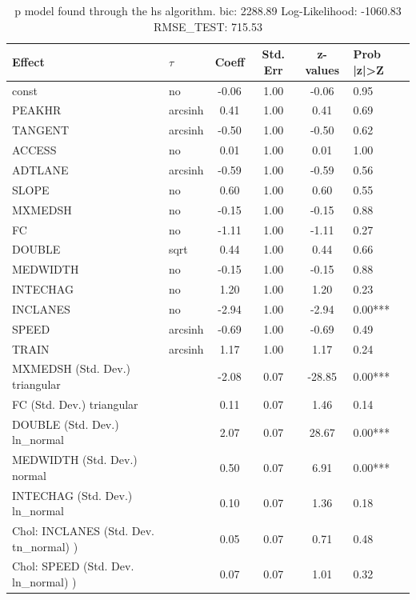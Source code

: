 \begin{table}
	\caption{p model found through the hs algorithm. bic: 2288.89 Log-Likelihood: -1060.83 RMSE_TEST: 715.53}
	\begin{center}
		\begin{tabular}{|l|l|c|c|c|l|}
			\hline
			Effect & $\tau$ & Coeff & Std. Err & z-values & Prob |z|>Z \\
			\hline
			const & no & -0.06 & 1.00 & -0.06 & 0.95 \\
			\hline
			PEAKHR & arcsinh & 0.41 & 1.00 & 0.41 & 0.69 \\
			\hline
			TANGENT & arcsinh & -0.50 & 1.00 & -0.50 & 0.62 \\
			\hline
			ACCESS & no & 0.01 & 1.00 & 0.01 & 1.00 \\
			\hline
			ADTLANE & arcsinh & -0.59 & 1.00 & -0.59 & 0.56 \\
			\hline
			SLOPE & no & 0.60 & 1.00 & 0.60 & 0.55 \\
			\hline
			MXMEDSH & no & -0.15 & 1.00 & -0.15 & 0.88 \\
			\hline
			FC & no & -1.11 & 1.00 & -1.11 & 0.27 \\
			\hline
			DOUBLE & sqrt & 0.44 & 1.00 & 0.44 & 0.66 \\
			\hline
			MEDWIDTH & no & -0.15 & 1.00 & -0.15 & 0.88 \\
			\hline
			INTECHAG & no & 1.20 & 1.00 & 1.20 & 0.23 \\
			\hline
			INCLANES & no & -2.94 & 1.00 & -2.94 & 0.00*** \\
			\hline
			SPEED & arcsinh & -0.69 & 1.00 & -0.69 & 0.49 \\
			\hline
			TRAIN & arcsinh & 1.17 & 1.00 & 1.17 & 0.24 \\
			\hline
			MXMEDSH (Std. Dev.) triangular &  & -2.08 & 0.07 & -28.85 & 0.00*** \\
			\hline
			FC (Std. Dev.) triangular &  & 0.11 & 0.07 & 1.46 & 0.14 \\
			\hline
			DOUBLE (Std. Dev.) ln_normal &  & 2.07 & 0.07 & 28.67 & 0.00*** \\
			\hline
			MEDWIDTH (Std. Dev.) normal &  & 0.50 & 0.07 & 6.91 & 0.00*** \\
			\hline
			INTECHAG (Std. Dev.) ln_normal &  & 0.10 & 0.07 & 1.36 & 0.18 \\
			\hline
			 Chol: INCLANES (Std. Dev. tn_normal) ) &  & 0.05 & 0.07 & 0.71 & 0.48 \\
			\hline
			 Chol: SPEED (Std. Dev. ln_normal) ) &  & 0.07 & 0.07 & 1.01 & 0.32 \\

\end{tabular}
\end{center}
\end{table}
